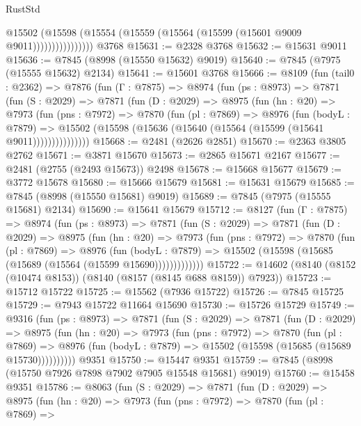 \begin{lexlean}{RustStd}
\begin{coremodule}
                      @15502
                        (@15598 (@15554 (@15559 (@15564 (@15599 (@15601 @9009 @9011))))))))))))))))
    @3768
@15631 := @2328 @3768
@15632 := @15631 @9011
@15636 := @7845 (@8998 (@15550 @15632) @9019)
@15640 := @7845 (@7975 (@15555 @15632) @2134)
@15641 := @15601 @3768
@15666 := @8109
    (fun (tail0 : @2362) =>
    @7876
      (fun (Γ : @7875) =>
      @8974
        (fun (ps : @8973) =>
        @7871
          (fun (S : @2029) =>
          @7871
            (fun (D : @2029) =>
            @8975
              (fun (hn : @20) =>
              @7973
                (fun (pns : @7972) =>
                @7870
                  (fun (pl : @7869) =>
                  @8976
                    (fun (bodyL : @7879) =>
                    @15502 (@15598 (@15636 (@15640 (@15564 (@15599 (@15641 @9011)))))))))))))))
@15668 := @2481 (@2626 @2851)
@15670 := @2363 @3805 @2762
@15671 := @3871 @15670
@15673 := @2865 @15671 @2167
@15677 := @2481 (@2755 (@2493 @15673)) @2498
@15678 := @15668 @15677
@15679 := @3772 @15678
@15680 := @15666 @15679
@15681 := @15631 @15679
@15685 := @7845 (@8998 (@15550 @15681) @9019)
@15689 := @7845 (@7975 (@15555 @15681) @2134)
@15690 := @15641 @15679
@15712 := @8127
    (fun (Γ : @7875) =>
    @8974
      (fun (ps : @8973) =>
      @7871
        (fun (S : @2029) =>
        @7871
          (fun (D : @2029) =>
          @8975
            (fun (hn : @20) =>
            @7973
              (fun (pns : @7972) =>
              @7870
                (fun (pl : @7869) =>
                @8976
                  (fun (bodyL : @7879) =>
                  @15502 (@15598 (@15685 (@15689 (@15564 (@15599 @15690)))))))))))))
@15722 := @14602 (@8140 (@8152 (@10474 @8153)) (@8140 (@8157 (@8145 @688 @8159)) @7923))
@15723 := @15712 @15722
@15725 := @15562 (@7936 @15722)
@15726 := @7845 @15725
@15729 := @7943 @15722 @11664 @15690
@15730 := @15726 @15729
@15749 := @9316
    (fun (ps : @8973) =>
    @7871
      (fun (S : @2029) =>
      @7871
        (fun (D : @2029) =>
        @8975
          (fun (hn : @20) =>
          @7973
            (fun (pns : @7972) =>
            @7870
              (fun (pl : @7869) =>
              @8976 (fun (bodyL : @7879) => @15502 (@15598 (@15685 (@15689 @15730))))))))))
    @9351
@15750 := @15447 @9351
@15759 := @7845 (@8998 (@15750 @7926 @7898 @7902 @7905 @15548 @15681) @9019)
@15760 := @15458 @9351
@15786 := @8063
    (fun (S : @2029) =>
    @7871
      (fun (D : @2029) =>
      @8975
        (fun (hn : @20) =>
        @7973
          (fun (pns : @7972) =>
          @7870
            (fun (pl : @7869) =>

\end{coremodule}
\end{lexlean}
